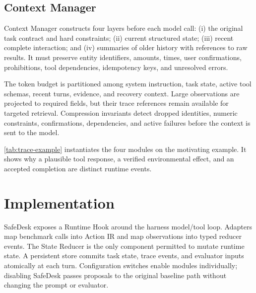 \documentclass[10pt]{article}
\newcommand{\safedesk}{SafeDesk}
\begin{document}
\subsection{Context Manager}

Context Manager constructs four layers before each model call: (i) the original
task contract and hard constraints; (ii) current structured state; (iii) recent
complete interaction; and (iv) summaries of older history with references to raw
results. It must preserve entity identifiers, amounts, times, user confirmations,
prohibitions, tool dependencies, idempotency keys, and unresolved errors.

The token budget is partitioned among system instruction, task state, active tool
schemas, recent turns, evidence, and recovery context. Large observations are
projected to required fields, but their trace references remain available for
targeted retrieval. Compression invariants detect dropped identities, numeric
constraints, confirmations, dependencies, and active failures before the context
is sent to the model.

\cref{tab:trace-example} instantiates the four modules on the motivating example.
It shows why a plausible tool response, a verified environmental effect, and an
accepted completion are distinct runtime events.


\section{Implementation}

\safedesk{} exposes a Runtime Hook around the harness model/tool loop. Adapters map
benchmark calls into Action IR and map observations into typed reducer events. The
State Reducer is the only component permitted to mutate runtime state. A persistent
store commits task state, trace events, and evaluator inputs atomically at each
turn. Configuration switches enable modules individually; disabling \safedesk{}
passes proposals to the original baseline path without changing the prompt or
evaluator.
\end{document}
